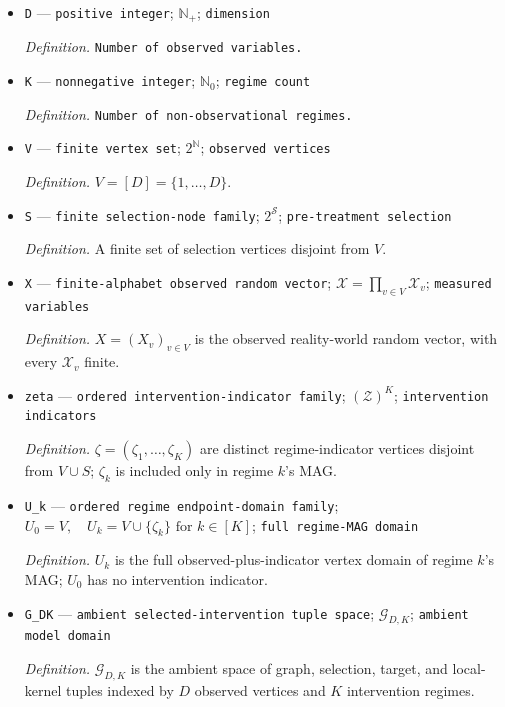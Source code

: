 \documentclass{article}
\begin{document}
\begin{itemize}
  \item \texttt{D} --- \texttt{positive integer}; \(\mathbb N_{+}\); \texttt{dimension}
  \par\smallskip\noindent\emph{Definition.} \texttt{Number of observed variables.}
  \item \texttt{K} --- \texttt{nonnegative integer}; \(\mathbb N_{0}\); \texttt{regime count}
  \par\smallskip\noindent\emph{Definition.} \texttt{Number of non-\allowbreak{}observational regimes.}
  \item \texttt{V} --- \texttt{finite vertex set}; \(2^{\mathbb N}\); \texttt{observed vertices}
  \par\smallskip\noindent\emph{Definition.} \(V=[D]=\{1,\ldots,D\}\).
  \item \texttt{S} --- \texttt{finite selection-\allowbreak{}node family}; \(2^{\mathcal S}\); \texttt{pre-\allowbreak{}treatment selection}
  \par\smallskip\noindent\emph{Definition.} A finite set of selection vertices disjoint from \(V\).
  \item \texttt{X} --- \texttt{finite-\allowbreak{}alphabet observed random vector}; \(\mathcal X=\prod_{v\in V}\mathcal X_v\); \texttt{measured variables}
  \par\smallskip\noindent\emph{Definition.} \(X=(X_v)_{v\in V}\) is the observed reality-world random vector, with every \(\mathcal X_v\) finite.
  \item \texttt{zeta} --- \texttt{ordered intervention-\allowbreak{}indicator family}; \((\mathcal Z)^K\); \texttt{intervention indicators}
  \par\smallskip\noindent\emph{Definition.} \(\zeta=(\zeta_1,\ldots,\zeta_K)\) are distinct regime-indicator vertices disjoint from \(V\cup S\); \(\zeta_k\) is included only in regime \(k\)'s MAG.
  \item \texttt{U\_\allowbreak{}k} --- \texttt{ordered regime endpoint-\allowbreak{}domain family}; \(U_0=V,\quad U_k=V\cup\{\zeta_k\}\text{ for }k\in[K]\); \texttt{full regime-\allowbreak{}MAG domain}
  \par\smallskip\noindent\emph{Definition.} \(U_k\) is the full observed-plus-indicator vertex domain of regime \(k\)'s MAG; \(U_0\) has no intervention indicator.
  \item \texttt{G\_\allowbreak{}DK} --- \texttt{ambient selected-\allowbreak{}intervention tuple space}; \(\mathcal G_{D,K}\); \texttt{ambient model domain}
  \par\smallskip\noindent\emph{Definition.} \(\mathcal G_{D,K}\) is the ambient space of graph, selection, target, and local-kernel tuples indexed by \(D\) observed vertices and \(K\) intervention regimes.

\end{itemize}
\end{document}
